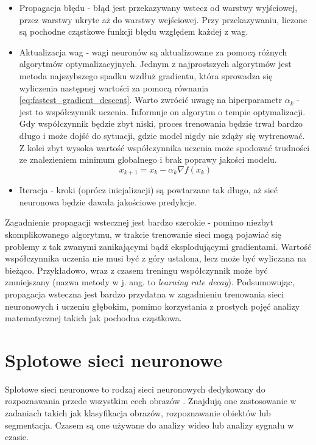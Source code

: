 \begin{itemize}
    \item Propagacja błędu - błąd jest przekazywany wstecz od warstwy wyjściowej, przez warstwy ukryte aż do warstwy wejściowej.
    Przy przekazywaniu, liczone są pochodne cząstkowe funkcji błędu względem każdej z wag.
    \item Aktualizacja wag - wagi neuronów są aktualizowane za pomocą różnych algorytmów optymalizacyjnych.
    Jednym z najprostszych algorytmów jest metoda najszybszego spadku wzdłuż gradientu, która sprowadza się wyliczenia następnej wartości za pomocą równania \ref{eq:fastest_gradient_descent}.
    Warto zwrócić uwagę na hiperparametr $\alpha_k$ - jest to współczynnik uczenia.
    Informuje on algorytm o tempie optymalizacji.
    Gdy współczynnik będzie zbyt niski, proces trenowania będzie trwał bardzo długo i może dojść do sytuacji, gdzie model nigdy nie zdąży się wytrenować.
    Z kolei zbyt wysoka wartość współczynnika uczenia może spodować trudności ze znalezieniem minimum globalnego i brak poprawy jakości modelu.
    \begin{equation}
        x_{k+1} = x_k - \alpha_k \nabla f(x_k)\label{eq:fastest_gradient_descent}
    \end{equation}
    \item Iteracja - kroki (oprócz inicjalizacji) są powtarzane tak długo, aż sieć neuronowa będzie dawała jakościowe predykcje.
\end{itemize}

Zagadnienie propagacji wstecznej jest bardzo szerokie - pomimo niezbyt skomplikowanego algorytmu, w trakcie trenowanie sieci mogą pojawiać się problemy z tak zwanymi zanikającymi bądź eksplodującymi gradientami.
Wartość współczynnika uczenia nie musi być z góry ustalona, lecz może być wyliczana na bieżąco.
Przykładowo, wraz z czasem treningu współczynnik może być zmniejszany (nazwa metody w j. ang. to \textit{learning rate decay}).
Podsumowując, propagacja wsteczna jest bardzo przydatna w zagadnieniu trenowania sieci neuronowych i uczeniu głębokim, pomimo korzystania z prostych pojęć analizy matematycznej takich jak pochodna cząstkowa.


\section{Splotowe sieci neuronowe}

Splotowe sieci neuronowe to rodzaj sieci neuronowych dedykowany do rozpoznawania przede wszystkim cech obrazów \cite{geron}.
Znajdują one zastosowanie w zadaniach takich jak klasyfikacja obrazów, rozpoznawanie obiektów lub segmentacja.
Czasem są one używane do analizy wideo lub analizy sygnału w czasie.


